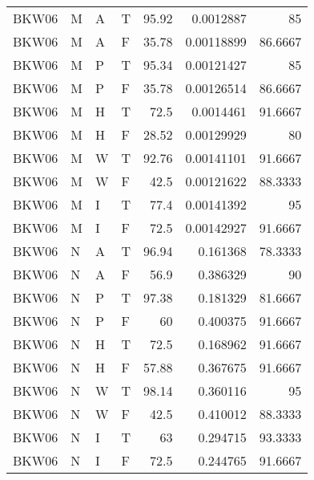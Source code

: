 \begin{tabular}{llllrrr}
    BKW06    & M     & A     & T          & 95.92      & 0.0012887   & 85       \\
    BKW06    & M     & A     & F          & 35.78      & 0.00118899  & 86.6667  \\
    BKW06    & M     & P     & T          & 95.34      & 0.00121427  & 85       \\
    BKW06    & M     & P     & F          & 35.78      & 0.00126514  & 86.6667  \\
    BKW06    & M     & H     & T          & 72.5       & 0.0014461   & 91.6667  \\
    BKW06    & M     & H     & F          & 28.52      & 0.00129929  & 80       \\
    BKW06    & M     & W     & T          & 92.76      & 0.00141101  & 91.6667  \\
    BKW06    & M     & W     & F          & 42.5       & 0.00121622  & 88.3333  \\
    BKW06    & M     & I     & T          & 77.4       & 0.00141392  & 95       \\
    BKW06    & M     & I     & F          & 72.5       & 0.00142927  & 91.6667  \\
    BKW06    & N     & A     & T          & 96.94      & 0.161368    & 78.3333  \\
    BKW06    & N     & A     & F          & 56.9       & 0.386329    & 90       \\
    BKW06    & N     & P     & T          & 97.38      & 0.181329    & 81.6667  \\
    BKW06    & N     & P     & F          & 60         & 0.400375    & 91.6667  \\
    BKW06    & N     & H     & T          & 72.5       & 0.168962    & 91.6667  \\
    BKW06    & N     & H     & F          & 57.88      & 0.367675    & 91.6667  \\
    BKW06    & N     & W     & T          & 98.14      & 0.360116    & 95       \\
    BKW06    & N     & W     & F          & 42.5       & 0.410012    & 88.3333  \\
    BKW06    & N     & I     & T          & 63         & 0.294715    & 93.3333  \\
    BKW06    & N     & I     & F          & 72.5       & 0.244765    & 91.6667  \\
    \hline
\end{tabular}